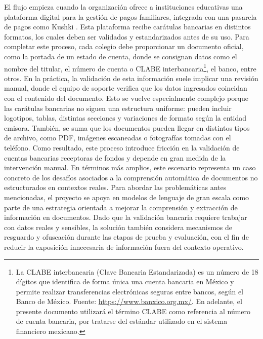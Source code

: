 El flujo empieza cuando la organización ofrece a instituciones educativas una plataforma digital para la gestión de pagos familiares, integrada con una pasarela de pagos como Kushki \cite{cometa_onboarding}. Esta plataforma recibe carátulas bancarias en distintos formatos, los cuales deben ser validados y estandarizados antes de su uso. Para completar este proceso, cada colegio debe proporcionar un documento oficial, como la portada de un estado de cuenta, donde se consignan datos como el nombre del titular, el número de cuenta o CLABE interbancaria\footnote{La CLABE interbancaria (Clave Bancaria Estandarizada) es un número de 18 dígitos que identifica de forma única una cuenta bancaria en México y permite realizar transferencias electrónicas seguras entre bancos, según el Banco de México. Fuente: \url{https://www.banxico.org.mx/}. En adelante, el presente documento utilizará el término CLABE como referencia al número de cuenta bancaria, por tratarse del estándar utilizado en el sistema financiero mexicano.}, el banco, entre otros. En la práctica, la validación de esta información suele implicar una revisión manual, donde el equipo de soporte verifica que los datos ingresados coincidan con el contenido del documento. Esto se vuelve especialmente complejo porque las carátulas bancarias no siguen una estructura uniforme: pueden incluir logotipos, tablas, distintas secciones y variaciones de formato según la entidad emisora. También, se suma que los documentos pueden llegar en distintos tipos de archivo, como PDF, imágenes escaneadas o fotografías tomadas con el teléfono. Como resultado, este proceso introduce fricción en la validación de cuentas bancarias receptoras de fondos y depende en gran medida de la intervención manual. En términos más amplios, este escenario representa un caso concreto de los desafíos asociados a la comprensión automática de documentos no estructurados en contextos reales. Para abordar las problemáticas antes mencionadas, el proyecto se apoya en modelos de lenguaje de gran escala como parte de una estrategia orientada a mejorar la comprensión y extracción de información en documentos. Dado que la validación bancaria requiere trabajar con datos reales y sensibles, la solución también considera mecanismos de resguardo y ofuscación durante las etapas de prueba y evaluación, con el fin de reducir la exposición innecesaria de información fuera del contexto operativo.

